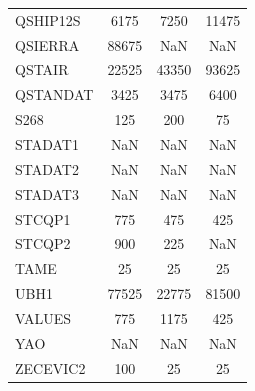 \begin{longtable}{lccc}
QSHIP12S &          6175 &          7250 &         11475 \\
QSIERRA  &         88675 &           NaN &           NaN \\
QSTAIR   &         22525 &         43350 &         93625 \\
QSTANDAT &          3425 &          3475 &          6400 \\
S268     &           125 &           200 &            75 \\
STADAT1  &           NaN &           NaN &           NaN \\
STADAT2  &           NaN &           NaN &           NaN \\
STADAT3  &           NaN &           NaN &           NaN \\
STCQP1   &           775 &           475 &           425 \\
STCQP2   &           900 &           225 &           NaN \\
TAME     &            25 &            25 &            25 \\
UBH1     &         77525 &         22775 &         81500 \\
VALUES   &           775 &          1175 &           425 \\
YAO      &           NaN &           NaN &           NaN \\
ZECEVIC2 &           100 &            25 &            25 \\
\end{longtable}
